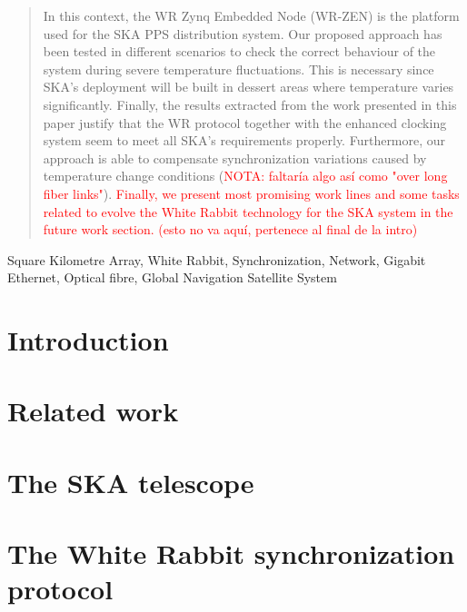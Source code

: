 \documentclass[review]{elsarticle}
\begin{document}
\begin{frontmatter}
\begin{abstract}
    In this context, 
	the WR Zynq Embedded Node (WR-ZEN) is the platform used for the 
	SKA PPS distribution system. Our proposed approach has been tested in different scenarios to check the correct behaviour of the system during severe temperature fluctuations. This is necessary since SKA's deployment will 
	be built in dessert areas where temperature varies significantly. Finally, the results extracted from the work presented in this paper justify 
	that the WR protocol together with the enhanced clocking system seem to meet all SKA's requirements properly. Furthermore, our approach is able to compensate synchronization variations caused by temperature change conditions (\textcolor{red}{NOTA: faltaría algo así como "over long fiber links"}). \textcolor{red}{
	Finally, we present most 
	promising work lines and some tasks related to evolve the White Rabbit 
	technology for the SKA system in the future work section. (esto no va aquí, pertenece al final de la intro)}
\end{abstract}

\begin{keyword}
	Square Kilometre Array, White Rabbit, Synchronization, Network, Gigabit 
	Ethernet, Optical fibre, Global Navigation Satellite System
\end{keyword}

\end{frontmatter}

\linenumbers

\section{Introduction} \label{sec:intro}



\section{Related work} \label{sec:related-work}


\section{The SKA telescope} \label{sec:ska}



\section{The White Rabbit synchronization protocol} \label{sec:wr}
\end{document}
